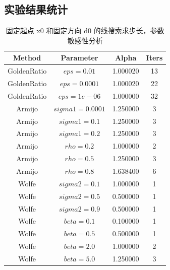 \documentclass[12pt,a4paper]{ctexart}
\begin{document}
\subsection{实验结果统计}

\begin{table}[H]
\centering
\caption{固定起点 x0 和固定方向 d0 的线搜索求步长，参数敏感性分析}
\begin{tabular}{cccc}
\toprule
\textbf{Method}          & \textbf{Parameter}          & \textbf{Alpha}      & \textbf{Iters} \\
\midrule
GoldenRatio     & $eps=0.01$           & 1.000020   & 13   \\
GoldenRatio     & $eps=0.0001$         & 1.000020   & 22   \\
GoldenRatio     & $eps=1e-06 $         & 1.000000   & 32   \\
\midrule
Armijo          & $sigma1=0.0001 $     & 1.250000   & 3    \\
Armijo          &$ sigma1=0.1 $        & 1.250000   & 3    \\
Armijo          & $sigma1=0.2  $       & 1.250000   & 3    \\
Armijo          & $rho=0.2$         & 1.000000   & 2    \\
Armijo          & $rho=0.5 $        & 1.250000   & 3    \\
Armijo          &$ rho=0.8$         & 1.638400   & 6    \\
\midrule
Wolfe           & $sigma2=0.1 $          & 1.000000   & 1    \\
Wolfe           & $sigma2=0.5 $          & 0.500000   & 1    \\
Wolfe           & $sigma2=0.9$           & 0.500000   & 1    \\
\midrule
Wolfe           & $beta=0.1 $            & 0.100000   & 1    \\
Wolfe           & $beta=0.5$             & 0.500000   & 1    \\
Wolfe           & $beta=2.0 $            & 1.000000   & 2    \\
Wolfe           &$ beta=5.0$             & 1.250000   & 3    \\
\bottomrule
\end{tabular}
\end{table}
\end{document}
